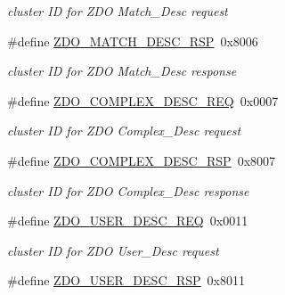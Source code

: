 \begin{DoxyCompactItemize}
\begin{DoxyCompactList}\small\item\em cluster I\-D for Z\-D\-O Match\-\_\-\-Desc request \end{DoxyCompactList}\item 
\hypertarget{group__zdo_ga693e5c00189b7ea1e748d35fce6c8501}{\#define \hyperlink{group__zdo_ga693e5c00189b7ea1e748d35fce6c8501}{Z\-D\-O\-\_\-\-M\-A\-T\-C\-H\-\_\-\-D\-E\-S\-C\-\_\-\-R\-S\-P}~0x8006}\label{group__zdo_ga693e5c00189b7ea1e748d35fce6c8501}

\begin{DoxyCompactList}\small\item\em cluster I\-D for Z\-D\-O Match\-\_\-\-Desc response \end{DoxyCompactList}\item 
\hypertarget{group__zdo_ga622e805b27540e3571d3a7450f617ad5}{\#define \hyperlink{group__zdo_ga622e805b27540e3571d3a7450f617ad5}{Z\-D\-O\-\_\-\-C\-O\-M\-P\-L\-E\-X\-\_\-\-D\-E\-S\-C\-\_\-\-R\-E\-Q}~0x0007}\label{group__zdo_ga622e805b27540e3571d3a7450f617ad5}

\begin{DoxyCompactList}\small\item\em cluster I\-D for Z\-D\-O Complex\-\_\-\-Desc request \end{DoxyCompactList}\item 
\hypertarget{group__zdo_gacf1b20af0440a2e2dd779e1e3111cc66}{\#define \hyperlink{group__zdo_gacf1b20af0440a2e2dd779e1e3111cc66}{Z\-D\-O\-\_\-\-C\-O\-M\-P\-L\-E\-X\-\_\-\-D\-E\-S\-C\-\_\-\-R\-S\-P}~0x8007}\label{group__zdo_gacf1b20af0440a2e2dd779e1e3111cc66}

\begin{DoxyCompactList}\small\item\em cluster I\-D for Z\-D\-O Complex\-\_\-\-Desc response \end{DoxyCompactList}\item 
\hypertarget{group__zdo_ga6e02c0cb5bec58a8a4bc799233284f9a}{\#define \hyperlink{group__zdo_ga6e02c0cb5bec58a8a4bc799233284f9a}{Z\-D\-O\-\_\-\-U\-S\-E\-R\-\_\-\-D\-E\-S\-C\-\_\-\-R\-E\-Q}~0x0011}\label{group__zdo_ga6e02c0cb5bec58a8a4bc799233284f9a}

\begin{DoxyCompactList}\small\item\em cluster I\-D for Z\-D\-O User\-\_\-\-Desc request \end{DoxyCompactList}\item 
\hypertarget{group__zdo_ga293e46b65ec35d55108029888e6b0a90}{\#define \hyperlink{group__zdo_ga293e46b65ec35d55108029888e6b0a90}{Z\-D\-O\-\_\-\-U\-S\-E\-R\-\_\-\-D\-E\-S\-C\-\_\-\-R\-S\-P}~0x8011}\label{group__zdo_ga293e46b65ec35d55108029888e6b0a90}


\end{DoxyCompactItemize}
